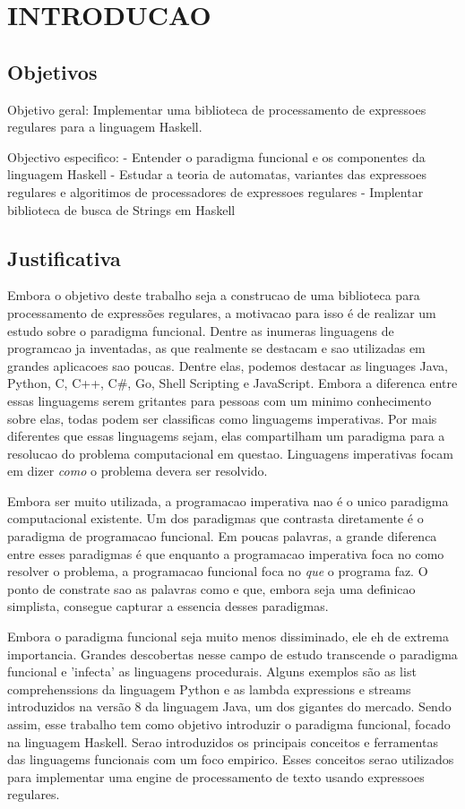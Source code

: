 \section{INTRODUCAO}
\subsection{Objetivos}
Objetivo geral: Implementar uma biblioteca de processamento de expressoes regulares para a linguagem Haskell.

Objectivo especifico:
- Entender o paradigma funcional e os componentes da linguagem Haskell
- Estudar a teoria de automatas, variantes das expressoes regulares e algoritimos de processadores de expressoes regulares
- Implentar biblioteca de busca de Strings em Haskell

\subsection{Justificativa}
Embora o objetivo deste trabalho seja a construcao de uma biblioteca para processamento de expressões regulares, a motivacao para isso é de realizar um estudo sobre o paradigma funcional.
Dentre as inumeras linguagens de programcao ja inventadas, as que realmente se destacam e sao utilizadas em grandes aplicacoes sao poucas.
Dentre elas, podemos destacar as linguages Java, Python, C, C++, C\#, Go, Shell Scripting e JavaScript.
Embora a diferenca entre essas linguagems serem gritantes para pessoas com um minimo conhecimento sobre elas, todas podem ser classificas como linguagems imperativas.
Por mais diferentes que essas linguagems sejam, elas compartilham um paradigma para a resolucao do problema computacional em questao.
Linguagens imperativas focam em dizer \emph{como} o problema devera ser resolvido.

Embora ser muito utilizada, a programacao imperativa nao é o unico paradigma computacional existente.
Um dos paradigmas que contrasta diretamente é o paradigma de programacao funcional.
Em poucas palavras, a grande diferenca entre esses paradigmas é que enquanto a programacao imperativa foca no como resolver o problema, a programacao funcional foca no \emph{que} o programa faz.
O ponto de constrate sao as palavras como e que, embora seja uma definicao simplista, consegue capturar a essencia desses paradigmas.

Embora o paradigma funcional seja muito menos dissiminado, ele eh de extrema importancia.
Grandes descobertas nesse campo de estudo transcende o paradigma funcional e 'infecta' as linguagens procedurais.
Alguns exemplos são as list comprehenssions da linguagem Python e as lambda expressions e streams introduzidos na versão 8 da linguagem Java, um dos gigantes do mercado.
Sendo assim, esse trabalho tem como objetivo introduzir o paradigma funcional, focado na linguagem Haskell.
Serao introduzidos os principais conceitos e ferramentas das linguagems funcionais com um foco empirico.
Esses conceitos serao utilizados para implementar uma engine de processamento de texto usando expressoes regulares.

